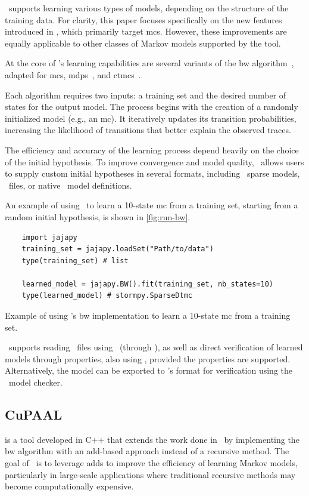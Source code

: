 \Jajapy\ supports learning various types of models, depending on the structure of the training data.
For clarity, this paper focuses specifically on the new features introduced in \JajapyTwo, which primarily target \glspl{mc}.
However, these improvements are equally applicable to other classes of Markov models supported by the tool.

At the core of \Jajapy's learning capabilities are several variants of the \gls{bw} algorithm~\cite{Baum70,Rabiner89}, adapted for \glspl{mc}, \glspl{mdp}~\cite{BacciILR21}, and \glspl{ctmc}~\cite{BacciILR23}.

Each algorithm requires two inputs: a training set and the desired number of states for the output model.
The process begins with the creation of a randomly initialized model (e.g., an \gls{mc}). It iteratively updates its transition probabilities, increasing the likelihood of transitions that better explain the observed traces.

The efficiency and accuracy of the learning process depend heavily on the choice of the initial hypothesis.
To improve convergence and model quality, \Jajapy\ allows users to supply custom initial hypotheses in several formats, including \Stormpy~sparse models, \Prism\ files, or native \Jajapy\ model definitions.

An example of using \Jajapy\ to learn a 10-state \gls{mc} from a training set, starting from a random initial hypothesis, is shown in \autoref{fig:run-bw}.


\begin{listing}
    \begin{verbatim} 
    import jajapy
    training_set = jajapy.loadSet("Path/to/data")
    type(training_set) # list 

    learned_model = jajapy.BW().fit(training_set, nb_states=10)
    type(learned_model) # stormpy.SparseDtmc 
    \end{verbatim}
    \caption{Example of using \Jajapy's \gls{bw} implementation to learn a 10-state \gls{mc} from a training set.}
    \label{fig:run-bw}
\end{listing}


\Jajapy\ supports reading \Prism\ files using \Storm\ (through \Stormpy), as well as direct verification of learned models through properties, also using \Storm, provided the properties are supported. Alternatively, the model can be exported to \Prism's format for verification using the \Prism\ model checker.


\subsection{CuPAAL}\label{subsec:cupaal}
\Cupaal is a tool developed in C++ that extends the work done in \Jajapy\ by implementing the \gls{bw} algorithm with an \gls{add}-based approach instead of a recursive method.
The goal of \Cupaal\ is to leverage \glspl{add} to improve the efficiency of learning Markov models, particularly in large-scale applications where traditional recursive methods may become computationally expensive.

